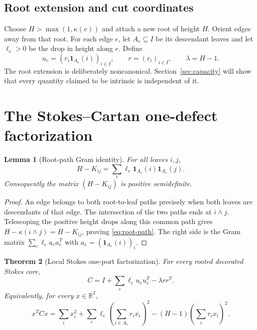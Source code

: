 \documentclass[11pt,a4paper]{amsart}
\theoremstyle{plain}
\newtheorem{theorem}{Theorem}[section]
\newtheorem{lemma}[theorem]{Lemma}
\theoremstyle{definition}
\newcommand{\RR}{\mathbb R}
\newcommand{\one}{\mathbf 1}
\begin{document}
\subsection{Root extension and cut coordinates}

Choose $H>\max(1,\kappa(v))$ and attach a new root of height $H$.  Orient edges away from that
root.  For each edge $e$, let $A_e\subseteq I$ be its descendant leaves and let $\ell_e>0$ be the
drop in height along $e$.  Define
\begin{equation}\label{eq:cut-vectors}
 u_e=(r_i\one_{A_e}(i))_{i\in I},\qquad r=(r_i)_{i\in I},
 \qquad \lambda=H-1.
\end{equation}
The root extension is deliberately noncanonical.  Section~\ref{sec:capacity} will show that every
quantity claimed to be intrinsic is independent of it.

\section{The Stokes--Cartan one-defect factorization}\label{sec:factor}

\begin{lemma}[Root-path Gram identity]\label{lem:root-path}
For all leaves $i,j$,
\begin{equation}\label{eq:root-path}
 H-K_{ij}=\sum_e\ell_e\one_{A_e}(i)\one_{A_e}(j).
\end{equation}
Consequently the matrix $(H-K_{ij})$ is positive semidefinite.
\end{lemma}

\begin{proof}
An edge belongs to both root-to-leaf paths precisely when both leaves are descendants of that
edge.  The intersection of the two paths ends at $i\wedge j$.  Telescoping the positive height
drops along this common path gives $H-\kappa(i\wedge j)=H-K_{ij}$, proving
\eqref{eq:root-path}.  The right side is the Gram matrix
$\sum_e\ell_e a_ea_e^T$ with $a_e=(\one_{A_e}(i))_i$.
\end{proof}

\begin{theorem}[Local Stokes one-port factorization]\label{thm:one-defect}
For every rooted decorated Stokes core,
\begin{equation}\label{eq:one-defect-matrix}
 \boxed{\quad C=I+\sum_e\ell_eu_eu_e^T-\lambda rr^T.\quad}
\end{equation}
Equivalently, for every $x\in\RR^I$,
\begin{equation}\label{eq:one-defect-q}
 \boxed{\quad
 x^TCx=\sum_i x_i^2+
 \sum_e\ell_e\left(\sum_{i\in A_e}r_ix_i\right)^2
 -(H-1)\left(\sum_i r_ix_i\right)^2.\quad}
\end{equation}
\end{theorem}
\end{document}
